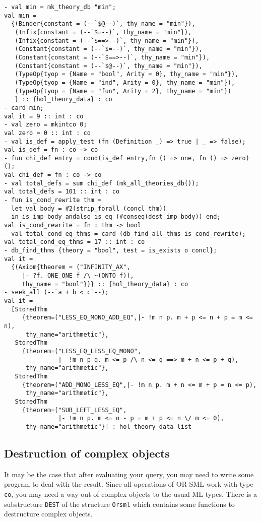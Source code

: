 {\small \begin{verbatim}
- val min = mk_theory_db "min";
val min =
  {(Binder{constant = (--`$@--)`, thy_name = "min"}),
   (Infix{constant = (--`$=--)`, thy_name = "min"}),
   (Infix{constant = (--`$==>--)`, thy_name = "min"}),
   (Constant{constant = (--`$=--)`, thy_name = "min"}),
   (Constant{constant = (--`$==>--)`, thy_name = "min"}),
   (Constant{constant = (--`$@--)`, thy_name = "min"}),
   (TypeOp{tyop = {Name = "bool", Arity = 0}, thy_name = "min"}),
   (TypeOp{tyop = {Name = "ind", Arity = 0}, thy_name = "min"}),
   (TypeOp{tyop = {Name = "fun", Arity = 2}, thy_name = "min"})
   } :: {hol_theory_data} : co
- card min;
val it = 9 :: int : co
- val zero = mkintco 0;
val zero = 0 :: int : co
- val is_def = apply_test (fn (Definition _) => true | _ => false);
val is_def = fn : co -> co
- fun chi_def entry = cond(is_def entry,fn () => one, fn () => zero) ();
val chi_def = fn : co -> co
- val total_defs = sum chi_def (mk_all_theories_db());
val total_defs = 101 :: int : co
- fun is_cond_rewrite thm =
  let val body = #2(strip_forall (concl thm))
  in is_imp body andalso is_eq (#conseq(dest_imp body)) end;
val is_cond_rewrite = fn : thm -> bool
- val total_cond_eq_thms = card (db_find_all_thms is_cond_rewrite);
val total_cond_eq_thms = 17 :: int : co
- db_find_thms {theory = "bool", test = is_exists o concl};
val it =
  {(Axiom{theorem = ("INFINITY_AX",
     |- ?f. ONE_ONE f /\ ~(ONTO f)),
     thy_name = "bool"})} :: {hol_theory_data} : co
- seek_all (--`a + b < c`--);
val it =
  [StoredThm
     {theorem=("LESS_EQ_MONO_ADD_EQ",|- !m n p. m + p <= n + p = m <= n),
      thy_name="arithmetic"},
   StoredThm
     {theorem=("LESS_EQ_LESS_EQ_MONO",
               |- !m n p q. m <= p /\ n <= q ==> m + n <= p + q),
      thy_name="arithmetic"},
   StoredThm
     {theorem=("ADD_MONO_LESS_EQ",|- !m n p. m + n <= m + p = n <= p),
      thy_name="arithmetic"},
   StoredThm
     {theorem=("SUB_LEFT_LESS_EQ",
               |- !m n p. m <= n - p = m + p <= n \/ m <= 0),
      thy_name="arithmetic"}] : hol_theory_data list

\end{verbatim} }

\subsection{Destruction of complex objects}

It may be the case that after evaluating your query, you may need to
write some program to deal with the result. Since all operations of
OR-SML work with type {\tt co}, you may need a way out of complex
objects to the usual ML types. There is a substructure {\tt DEST} of
the structure {\tt Orsml} which contains some functions to destructure
complex objects.

